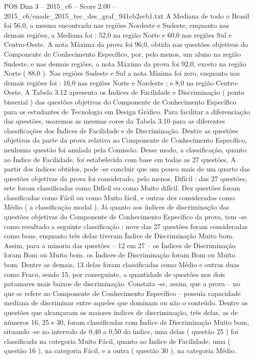\begin{textsample}{POS Dim 3 – 2015\_c6 – Score 2.00 – 2015\_c6/enade\_2015\_tec\_des\_graf\_941cb2ecb1.txt}
A Mediana de todo o Brasil foi 56,0, a mesma encontrada nas regiões Nordeste e Sudeste, enquanto nas demais regiões, a Mediana foi : 52,0 na região Norte e 60,0 nas regiões Sul e Centro-Oeste.
A nota Máxima da prova foi 96,0, obtida nas questões objetivas do Componente de Conhecimento Específico, por, pelo menos, um aluno na região Sudeste, e nas demais regiões, a nota Máxima da prova foi 92,0, exceto na região Norte ( 88,0 ).
Nas regiões Sudeste e Sul a nota Mínima foi zero, enquanto nas demais regiões foi : 16,0 nas regiões Norte e Nordeste ; e 8,0 na região Centro-Oeste.
A Tabela 3.12 apresenta os Índices de Facilidade e Discriminação ( ponto bisserial ) das questões objetivas do Componente de Conhecimento Específico para os estudantes de Tecnologia em Design Gráfico.
Para facilitar a diferenciação das questões, usaremos as mesmas cores da Tabela 3.10 para as diferentes classificações dos Índices de Facilidade e de Discriminação.
Dentre as questões objetivas da parte da prova relativa ao Componente de Conhecimento Específico, nenhuma questão foi anulada pela Comissão.
Desse modo, a classificação, quanto ao Índice de Facilidade, foi estabelecida com base em todas as 27 questões.
A partir dos índices obtidos, pode -se concluir que um pouco mais de um quarto das questões objetivas da prova foi considerado, pelo menos, Difícil : das 27 questões, sete foram classificadas como Difícil ou como Muito difícil.
Dez questões foram classificadas como Fácil ou como Muito fácil, e outras dez consideradas como Médio ( a classificação modal ).
Já quanto aos índices de discriminação das questões objetivas do Componente de Conhecimento Específico da prova, tem -se como resultado a seguinte classificação : nove das 27 questões foram consideradas como boas, enquanto três delas tiveram Índice de Discriminação Muito bom.
Assim, para a minoria das questões – 12 em 27 – os Índices de Discriminação foram Bom ou Muito bom. os Índices de Discriminação foram Bom ou Muito bom.
Dentre as demais, 13 delas foram classificadas como Médio e outras duas como Fraco, sendo 15, por conseguinte, a quantidade de questões nos dois patamares mais baixos de discriminação.
Constata -se, assim, que a prova – no que se refere ao Componente de Conhecimento Específico – possuía capacidade mediana de discriminar entre aqueles que dominam ou não o conteúdo.
Dentre as questões que alcançaram os maiores índices de discriminação, três delas, as de números 16, 25 e 30, foram classificadas com Índice de Discriminação Muito bom, situando -se no intervalo de 0,40 a 0,50 do índice, uma delas ( questão 25 ) foi classificada na categoria Muito Fácil, quanto ao Índice de Facilidade, uma ( questão 16 ), na categoria Fácil, e a outra ( questão 30 ), na categoria Médio.

\end{textsample}
